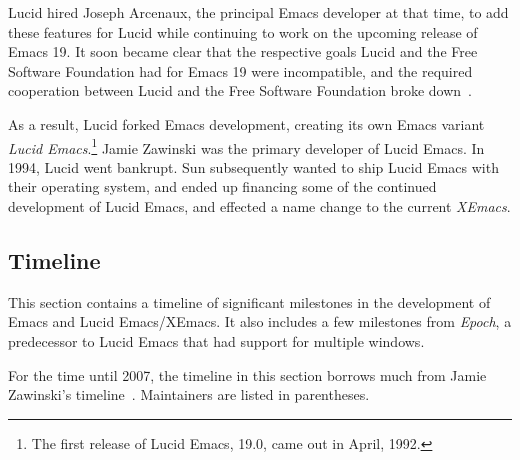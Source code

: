\documentclass[format=acmsmall, review]{acmart}
\begin{document}
Lucid hired Joseph Arcenaux,
the principal Emacs developer at that time, to add these features
for Lucid while continuing to work on the upcoming release of Emacs
19.  It soon became clear that the respective goals Lucid and the Free
Software Foundation had for Emacs 19 were incompatible,
and the required cooperation between Lucid and
the Free Software Foundation broke down~\cite{Arcenaux-interview}.

As a result, Lucid
forked Emacs development, creating its own Emacs variant \emph{Lucid
Emacs}.\footnote{The first release of Lucid Emacs, 19.0, came out in April,
1992.}  Jamie Zawinski was the primary developer of Lucid Emacs.
In 1994, Lucid went bankrupt.  Sun subsequently wanted to ship
Lucid Emacs with their operating system, and ended up financing some
of the continued development of Lucid Emacs, and effected a name
change to the current \emph{XEmacs}.


\subsection{Timeline}


This section contains a timeline of significant milestones in the
development of Emacs and Lucid Emacs/XEmacs.  It also includes a few
milestones from \textit{Epoch}, a predecessor to Lucid Emacs that
had support for multiple windows.

For the time until 2007, the timeline in this section borrows much
from Jamie Zawinski's timeline~\cite{JWZTimeline}.  Maintainers are
listed in parentheses.
\end{document}
